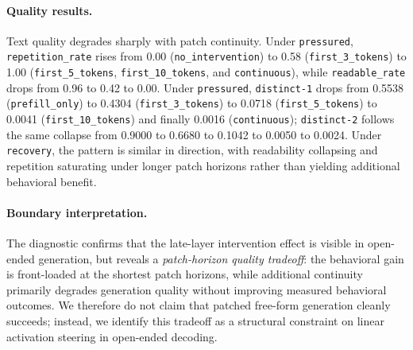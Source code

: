 \documentclass[11pt]{article}
\newcommand{\metric}[1]{\texttt{#1}}
\begin{document}
\paragraph{Quality results.}
Text quality degrades sharply with patch continuity.
Under \metric{pressured}, \metric{repetition\_rate} rises from 0.00 (\metric{no\_intervention}) to 0.58 (\metric{first\_3\_tokens}) to 1.00 (\metric{first\_5\_tokens}, \metric{first\_10\_tokens}, and \metric{continuous}), while \metric{readable\_rate} drops from 0.96 to 0.42 to 0.00.
Under \metric{pressured}, \metric{distinct-1} drops from 0.5538 (\metric{prefill\_only}) to 0.4304 (\metric{first\_3\_tokens}) to 0.0718 (\metric{first\_5\_tokens}) to 0.0041 (\metric{first\_10\_tokens}) and finally 0.0016 (\metric{continuous}); \metric{distinct-2} follows the same collapse from 0.9000 to 0.6680 to 0.1042 to 0.0050 to 0.0024.
Under \metric{recovery}, the pattern is similar in direction, with readability collapsing and repetition saturating under longer patch horizons rather than yielding additional behavioral benefit.

\paragraph{Boundary interpretation.}
The diagnostic confirms that the late-layer intervention effect is visible in open-ended generation, but reveals a \emph{patch-horizon quality tradeoff}: the behavioral gain is front-loaded at the shortest patch horizons, while additional continuity primarily degrades generation quality without improving measured behavioral outcomes.
We therefore do not claim that patched free-form generation cleanly succeeds; instead, we identify this tradeoff as a structural constraint on linear activation steering in open-ended decoding.
\end{document}
